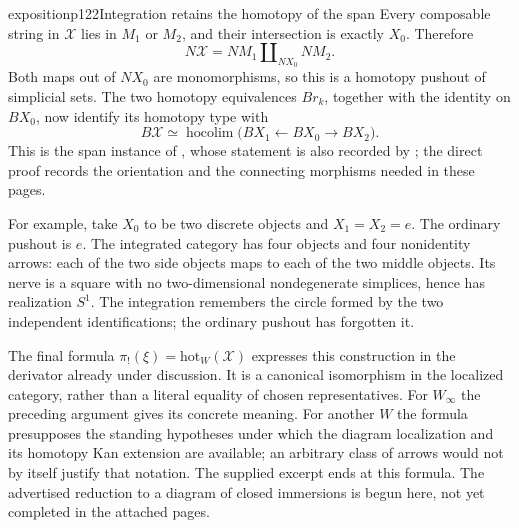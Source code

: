 \begin{dcomment}{exposition}{p122}{Integration retains the homotopy of the span}
Every composable string in $\mathscr X$ lies in $M_1$ or $M_2$, and their intersection is exactly $X_0$. Therefore
\[
 N\mathscr X=NM_1\amalg_{NX_0}NM_2.
\]
Both maps out of $NX_0$ are monomorphisms, so this is a homotopy pushout of simplicial sets. The two homotopy equivalences $Br_k$, together with the identity on $BX_0$, now identify its homotopy type with
\[
 B\mathscr X\simeq
 \operatorname{hocolim}\bigl(BX_1\leftarrow BX_0\to BX_2\bigr).
\]
This is the span instance of \citet[Theorem~1.2]{Thomason1979}, whose statement is also recorded by \citet[Corollary~26.9]{ChacholskiScherer2001}; the direct proof records the orientation and the connecting morphisms needed in these pages.

For example, take $X_0$ to be two discrete objects and $X_1=X_2=e$. The ordinary pushout is $e$. The integrated category has four objects and four nonidentity arrows: each of the two side objects maps to each of the two middle objects. Its nerve is a square with no two-dimensional nondegenerate simplices, hence has realization $S^1$. The integration remembers the circle formed by the two independent identifications; the ordinary pushout has forgotten it.

The final formula $\pi_!(\xi)=\mathrm{hot}_W(\mathscr X)$ expresses this construction in the derivator already under discussion. It is a canonical isomorphism in the localized category, rather than a literal equality of chosen representatives. For $W_\infty$ the preceding argument gives its concrete meaning. For another $W$ the formula presupposes the standing hypotheses under which the diagram localization and its homotopy Kan extension are available; an arbitrary class of arrows would not by itself justify that notation. The supplied excerpt ends at this formula. The advertised reduction to a diagram of closed immersions is begun here, not yet completed in the attached pages.
\end{dcomment}
